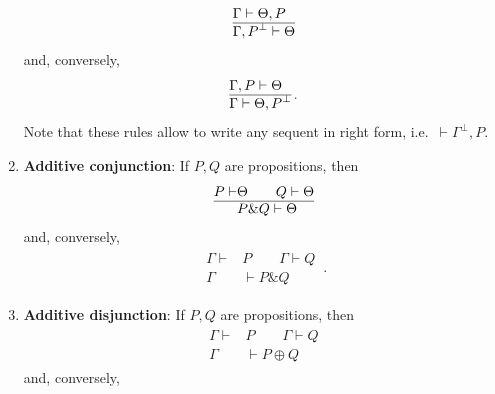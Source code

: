 \begin{enumerate}
\begin{gather}
                \begin{aligned}
                    &\Gamma\vdash\Theta,P\\
                    \hline
                    &\Gamma,P^\perp\vdash\Theta
                \end{aligned}
            \end{gather}
            and, conversely,
            \begin{gather}
                \label{quantum_information:negation_rule}
                \begin{aligned}
                    &\Gamma,P\vdash\Theta\\
                    \hline
                    &\Gamma\vdash\Theta,P^\perp
                \end{aligned}\,.
            \end{gather}
            Note that these rules allow to write any sequent in right form, i.e.~$\vdash\Gamma^\perp,P$.
        \item\textbf{Additive conjunction}: If $P,Q$ are propositions, then
            \begin{gather}
                \begin{aligned}
                    P\vdash& \Theta\qquad Q\vdash\Theta\\
                    \hline
                    &P\& Q\vdash\Theta
                \end{aligned}
            \end{gather}
            and, conversely,
            \begin{gather}
                \begin{aligned}
                    \Gamma\vdash&P\qquad\Gamma\vdash Q\\
                    \hline
                    \Gamma&\vdash P\&Q
                \end{aligned}\,.
            \end{gather}
        \item\textbf{Additive disjunction}: If $P,Q$ are propositions, then
            \begin{gather}
                \begin{aligned}
                    \Gamma\vdash&P\qquad\Gamma\vdash Q\\
                    \hline
                    \Gamma&\vdash P\oplus Q
                \end{aligned}
            \end{gather}
            and, conversely,

\end{enumerate}
